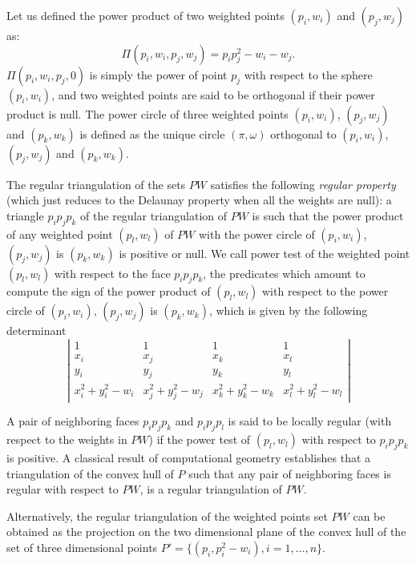 Let us defined the power product of two weighted points
$(p_i, w_i)$ and $(p_j, w_j)$ as:
\[\Pi(p_i, w_i,p_j, w_j) = p_ip_j ^2 - w_i  - w_j  .\]
$\Pi(p_i, w_i,p_j, 0)$ is simply the power of point $p_j$
with respect to the sphere $(p_i, w_i)$, and two weighted points 
are said to be orthogonal if their power product is null.
The power circle of three weighted points
 $(p_i, w_i)$, $(p_j, w_j)$
and $(p_k, w_k)$ is defined as the unique circle
$(\pi, \omega)$  orthogonal to
 $(p_i, w_i)$, $(p_j, w_j)$
and $(p_k, w_k)$.

The regular triangulation of the sets ${  PW}$
satisfies the following {\em regular property} (which just reduces to the 
Delaunay property when all the weights are null):
a triangle $p_ip_jp_k$ of the regular triangulation
of ${  PW}$ is such that the power product of any weighted point
 $(p_l, w_l)$ of ${  PW}$ with the power circle of
 $(p_i, w_i)$, $(p_j, w_j)$ is $(p_k, w_k)$ is positive or null.
We call  power test of the weighted point $(p_l, w_l)$ with respect
to the face  $p_ip_jp_k$, the predicates which amount to compute
the sign of 
the power product of $(p_l, w_l)$ with respect to
the power circle of
 $(p_i, w_i)$, $(p_j, w_j)$ is $(p_k, w_k)$,
which is given by the following
determinant
\[\left| \begin{array}{cccc}
1    & 1                       & 1                       & 1 \\
x_i & x_j & x_k & x_l \\
y_i & y_j & y_k & y_l \\
x_i ^2 + y_i ^2 -w_i & x_j ^2 + y_j ^2 - w_j & x_k ^2 + y_k ^2 - w_k &
x_l ^2 + y_l ^2 -w_l  
\end{array}
\right|
\]

A pair of neighboring faces $p_ip_jp_k$
and $p_ip_jp_l$ is said to be locally regular
(with respect to  the weights in ${  PW}$)
if the power test of $(p_l,w_l)$ with respect to
$p_ip_jp_k$ is positive.
A classical  result of computational geometry
establishes that a triangulation of the convex hull of ${  P}$
such that any pair of neighboring faces is regular with respect
to ${  PW}$, is a
 regular triangulation of ${  PW}$.

Alternatively, the regular triangulation
of the weighted points set ${  PW}$
can be obtained as the projection
on the two dimensional plane of the convex hull of the set of three
dimensional points 
${  P'}= \{ (p_i,p_i ^2 - w_i ), i = 1, \ldots , n \}$.

